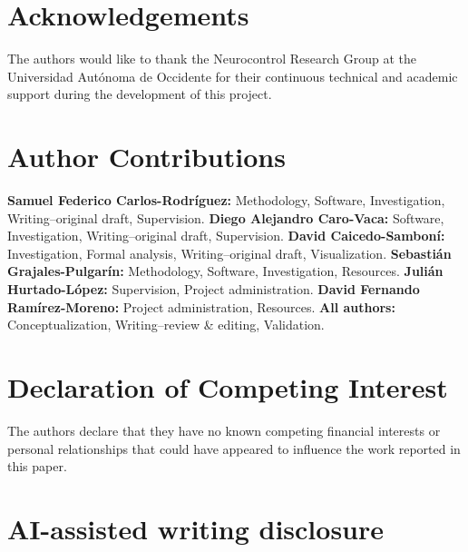\section*{Acknowledgements}

The authors would like to thank the Neurocontrol Research Group at the Universidad Autónoma de Occidente for their continuous technical and academic support during the development of this project.

\section*{Author Contributions}

\textbf{Samuel Federico Carlos-Rodríguez:} Methodology, Software, Investigation, Writing--original draft, Supervision.
\textbf{Diego Alejandro Caro-Vaca:} Software, Investigation, Writing--original draft, Supervision.
\textbf{David Caicedo-Samboní:} Investigation, Formal analysis, Writing--original draft, Visualization.
\textbf{Sebastián Grajales-Pulgarín:} Methodology, Software, Investigation, Resources.
\textbf{Julián Hurtado-López:} Supervision, Project administration.
\textbf{David Fernando Ramírez-Moreno:} Project administration, Resources.
\textbf{All authors:} Conceptualization, Writing--review \& editing, Validation.

\section*{Declaration of Competing Interest}

The authors declare that they have no known competing financial interests or personal relationships that could have appeared to influence the work reported in this paper.

\section*{AI-assisted writing disclosure}



